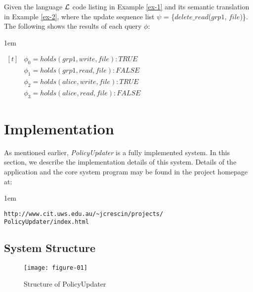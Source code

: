 \documentclass[global,twocolumn,final]{svjour}
\newenvironment{vexample}
  {\begin{example}\hspace{0.25em}}
  {\end{example}}
\newenvironment{vquote}
  {\begin{list}{}{\leftmargin 1em}\item[]}
  {\end{list}}
\begin{document}
    \begin{vexample}
      \label{ex-3}
      Given the language ${\cal L}$ code listing in Example \ref{ex-1} and its
      semantic translation in Example \ref{ex-2}, where the update sequence
      list $\psi$ = \{$delete\_read$($grp1$, $file$)\}. The following shows the
      results of each query $\phi$:

      \begin{vquote}
        \begin{math}
          \begin{aligned}[t]
            &\phi_{0} = holds(grp1, write, file) : TRUE \\
            &\phi_{1} = holds(grp1, read, file) : FALSE \\
            &\phi_{2} = holds(alice, write, file) : TRUE \\
            &\phi_{3} = holds(alice, read, file) : FALSE
          \end{aligned}
        \end{math}
      \end{vquote}
    \end{vexample}

  \section{Implementation}
    \label{sec-implement}

    As mentioned earlier, {\em PolicyUpdater} is a fully implemented system.
    In this section, we describe the implementation details of this system.
    Details of the application and the core system program may be found in
    the project homepage at:

    \begin{vquote}
      {\tt\scriptsize http://www.cit.uws.edu.au/\~{}jcrescin/projects/} \\
      {\tt\scriptsize PolicyUpdater/index.html}
    \end{vquote}

    \subsection{System Structure}

    \begin{figure}[ht]
      \begin{center}
        \texttt{[image: figure-01]}
        \caption{Structure of PolicyUpdater}
        \label{fig-1}
      \end{center}
    \end{figure}
\end{document}
